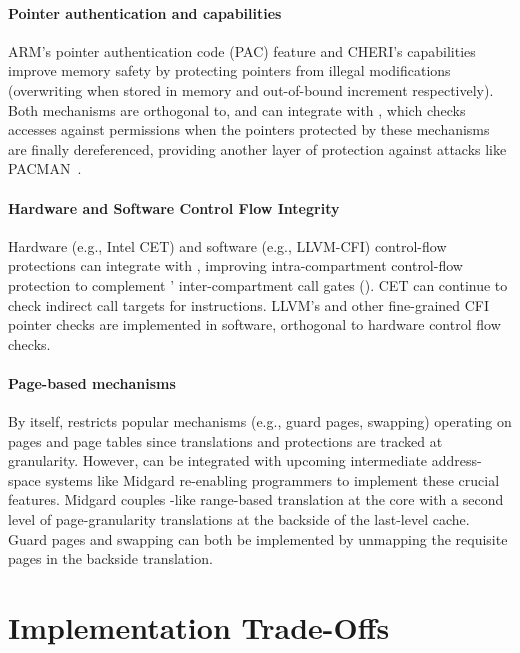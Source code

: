 \paragraph{Pointer authentication and capabilities}
ARM's pointer authentication code (PAC) feature and CHERI's capabilities
improve memory safety by protecting pointers from illegal 
modifications (overwriting when stored in memory and out-of-bound
increment respectively). Both mechanisms are orthogonal to,
and can integrate with \seccells, which checks accesses against \ptable
permissions when the 
pointers protected by these mechanisms are finally dereferenced, providing
another layer of protection against attacks like PACMAN~\cite{pacmanRavichandranNLY22}.

\paragraph{Hardware and Software Control Flow Integrity}
Hardware (e.g., Intel CET) and software (e.g., LLVM-CFI) control-flow
protections can integrate with \seccells, 
improving intra-compartment control-flow protection to
complement \seccells' inter-compartment call gates (\sdentry).
CET can continue to check indirect call targets for  instructions. 
LLVM's and other fine-grained CFI pointer checks are implemented in software, 
orthogonal to hardware control flow checks.


\paragraph{Page-based mechanisms}
By itself, \seccells restricts popular mechanisms (e.g., guard pages, swapping)
operating on pages and page tables since translations and protections are 
tracked at \cell granularity.
However, \seccells can be integrated with upcoming intermediate address-space 
systems like Midgard re-enabling programmers to implement these crucial 
features.
Midgard couples \seccells-like range-based translation at the core with
a second level of page-granularity translations at the backside of the 
last-level cache.
Guard pages and swapping can both be implemented by unmapping the requisite pages 
in the backside translation.


\section{\seccells Implementation Trade-Offs}
\label{app:seccells:impl_options}

